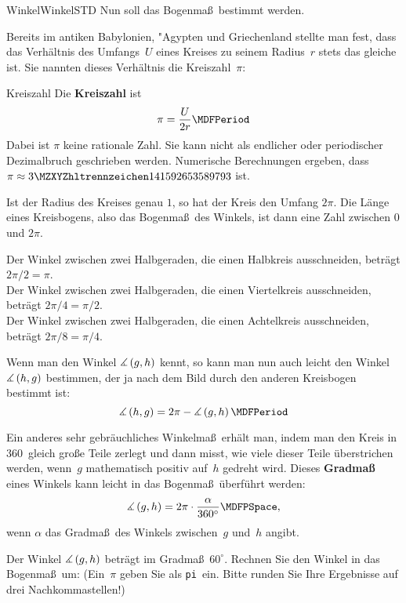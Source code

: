 \begin{MXContent}{Winkel}{Winkel}{STD}
Nun soll das Bogenma\ss\ bestimmt werden.

Bereits im antiken Babylonien, "Agypten und Griechenland stellte man fest, 
dass das Verh\"altnis des
Umfangs~$U$ eines Kreises zu seinem Radius~$r$ stets das gleiche ist.
Sie nannten dieses Verh\"altnis die Kreiszahl~$\pi$: 
\begin{MXInfo}{Kreiszahl}%
Die \textbf{Kreiszahl} ist
\[
    \pi = \frac{U}{2r} \MDFPeriod
\]
Dabei ist $\pi$ keine rationale Zahl. Sie kann nicht als endlicher oder 
periodischer Dezimalbruch geschrieben werden. Numerische Berechnungen ergeben,
dass $\pi \approx \MZahl{3}{141592653589793}$ ist.
\end{MXInfo}

Ist der Radius des Kreises genau $1$, so hat der Kreis den Umfang $2\pi$. Die L\"ange eines Kreisbogens, also das Bogenma\ss\ des Winkels, ist dann eine Zahl zwischen $0$ und $2\pi$.

\begin{MExample}
Der Winkel zwischen zwei Halbgeraden, die einen Halbkreis ausschneiden, betr\"agt $2\pi/2=\pi$.\\
Der Winkel zwischen zwei Halbgeraden, die einen Viertelkreis ausschneiden, betr\"agt $2\pi/4=\pi/2$.\\
Der Winkel zwischen zwei Halbgeraden, die einen Achtelkreis ausschneiden, betr\"agt $2\pi/8=\pi/4$.
\end{MExample}


Wenn man den Winkel $\measuredangle \left( g, h \right)$ kennt, so kann man nun auch leicht den Winkel $\measuredangle \left( h, g \right)$ bestimmen, der ja nach dem Bild  durch den anderen Kreisbogen bestimmt ist:
\[
   \Mmeasuredangle \left( h, g \right)
 = 2 \pi - \Mmeasuredangle \left( g, h \right) \MDFPeriod
\]


Ein anderes sehr gebr\"auchliches Winkelma\ss\ erh\"alt man, indem man den Kreis in 360~gleich
gro\ss e Teile zerlegt und dann misst, wie viele dieser Teile
\"uberstrichen werden, wenn~$g$ mathematisch positiv auf~$h$ gedreht wird.
Dieses \textbf{Gradma\ss} eines Winkels kann leicht in das
Bogenma\ss\ \"uberf\"uhrt werden:
\[
   \Mmeasuredangle \left( g, h \right)
 = 2 \pi \cdot \frac{\alpha}{360^{\circ}} \MDFPSpace,
\]
wenn $\alpha$ das Gradma\ss\ des Winkels zwischen~$g$ und~$h$ angibt.

\begin{MExercise}
Der Winkel $\measuredangle\left(g, h\right)$ betr\"agt im Gradma\ss\ $60^\circ$. Rechnen Sie den Winkel in das Bogenma\ss\ um:
\ifttm%
(Ein~$\pi$ geben Sie als \glqq\texttt{pi}\grqq\ ein. Bitte runden Sie Ihre Ergebnisse auf drei Nachkommastellen!)
\fi


\end{MExercise}
\end{MXContent}
